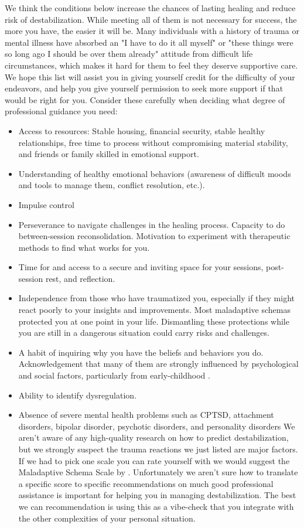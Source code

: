 \documentclass[12pt,letterpaper]{book}
\begin{document}
We think the conditions below increase the chances of lasting healing and reduce risk of destabilization. While meeting all of them is not necessary for success, the more you have, the easier it will be. Many individuals with a history of trauma or mental illness have absorbed an "I have to do it all myself" or "these things were so long ago I should be over them already" attitude from difficult life circumstances, which makes it hard for them to feel they deserve supportive care. We hope this list will assist you in giving yourself credit for the difficulty of your endeavors, and help you give yourself permission to seek more support if that would be right for you. Consider these carefully when deciding what degree of professional guidance you need:
\begin{itemize}
    \item Access to resources: Stable housing, financial security, stable healthy relationships, free time to process without compromising material stability, and friends or family skilled in emotional support.
    \item Understanding of healthy emotional behaviors (awareness of difficult moods and tools to manage them, conflict resolution, etc.).
    \item Impulse control
    \item Perseverance to navigate challenges in the healing process. Capacity to do between-session reconsolidation. Motivation to experiment with therapeutic methods to find what works for you.
    \item Time for and access to a secure and inviting space for your sessions, post-session rest, and reflection.
    \item Independence from those who have traumatized you, especially if they might react poorly to your insights and improvements. Most maladaptive schemas protected you at one point in your life. Dismantling these protections while you are still in a dangerous situation could carry risks and challenges.
    \item A habit of inquiring why you have the beliefs and behaviors you do. Acknowledgement that many of them are strongly influenced by psychological and social factors, particularly from early-childhood \cite{brownAttachmentDisturbances}.
    \item Ability to identify dysregulation.
    \item Absence of severe mental health problems such as CPTSD, attachment disorders, bipolar disorder, psychotic disorders, and personality disorders \label{assessDestabilizationRisk} We aren't aware of any high-quality research on how to predict destabilization, but we strongly suspect the trauma reactions we just listed are major factors. If we had to pick one scale you can rate yourself with we would suggest the Maladaptive Schema Scale by \textcite{maladaptiveSchemaScale}. Unfortunately we aren't sure how to translate a specific score to specific recommendations on much good professional assistance is important for helping you in managing destabilization. The best we can recommendation is using this as a vibe-check that you integrate with the other complexities of your personal situation.
\end{itemize}
\end{document}
